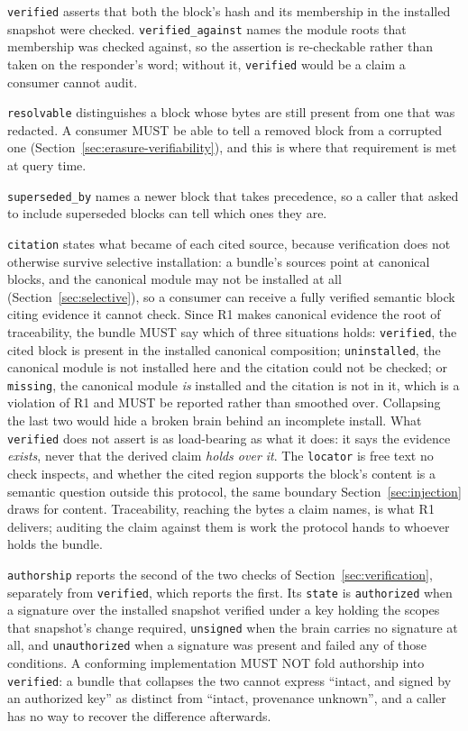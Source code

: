 \documentclass[11pt,a4paper]{article}
\begin{document}
\texttt{verified} asserts that both the block's hash and its membership in the
installed snapshot were checked. \texttt{verified\_against} names the module roots that membership was checked
against, so the assertion is re-checkable rather than taken on the responder's
word; without it, \texttt{verified} would be a claim a consumer cannot audit.

\texttt{resolvable} distinguishes a block whose bytes are still present from one
that was redacted. A consumer MUST be able to tell a removed block from a
corrupted one (Section~\ref{sec:erasure-verifiability}), and this is where that
requirement is met at query time.

\texttt{superseded\_by} names a newer block that takes precedence, so a caller
that asked to include superseded blocks can tell which ones they are.

\texttt{citation} states what became of each cited source, because
verification does not otherwise survive selective installation: a bundle's
sources point at canonical blocks, and the canonical module may not be
installed at all (Section~\ref{sec:selective}), so a consumer can receive a
fully verified semantic block citing evidence it cannot check. Since R1 makes canonical evidence the root of traceability, the bundle MUST
say which of three situations holds: \texttt{verified}, the cited block is
present in the installed canonical composition; \texttt{uninstalled}, the
canonical module is not installed here and the citation could not be checked;
or \texttt{missing}, the canonical module \emph{is} installed and the citation
is not in it, which is a violation of R1 and MUST be reported rather than
smoothed over. Collapsing the last two would hide a broken brain behind an
incomplete install. What \texttt{verified} does not assert is as load-bearing
as what it does: it says the evidence \emph{exists}, never that the derived
claim \emph{holds over it}. The \texttt{locator} is free text no check
inspects, and whether the cited region supports the block's content is a
semantic question outside this protocol, the same boundary
Section~\ref{sec:injection} draws for content. Traceability, reaching the
bytes a claim names, is what R1 delivers; auditing the claim against them is
work the protocol hands to whoever holds the bundle.

\texttt{authorship} reports the second of the two checks of
Section~\ref{sec:verification}, separately from \texttt{verified}, which reports
the first. Its \texttt{state} is \texttt{authorized} when a signature over the
installed snapshot verified under a key holding the scopes that snapshot's change
required, \texttt{unsigned} when the brain carries no signature at all, and
\texttt{unauthorized} when a signature was present and failed any of those
conditions. A conforming implementation MUST NOT fold authorship into
\texttt{verified}: a bundle that collapses the two cannot express ``intact, and
signed by an authorized key'' as distinct from ``intact, provenance unknown'',
and a caller has no way to recover the difference afterwards.
\end{document}

